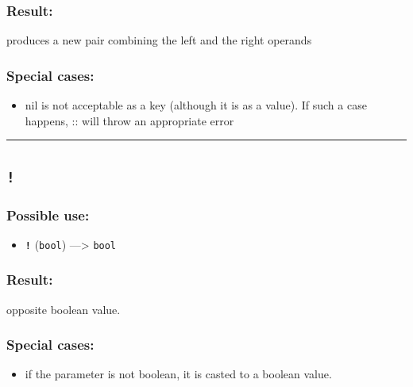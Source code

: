 \documentclass[]{book}
\providecommand{\tightlist}{%
  \setlength{\itemsep}{0pt}\setlength{\parskip}{0pt}}
\theoremstyle{definition}
\theoremstyle{definition}
\theoremstyle{definition}
\theoremstyle{remark}
\begin{document}
\subsubsection{Result:}\label{result-1}

produces a new pair combining the left and the right operands

\subsubsection{Special cases:}\label{special-cases-1}

\begin{itemize}
\tightlist
\item
  nil is not acceptable as a key (although it is as a value). If such a
  case happens, :: will throw an appropriate error
\end{itemize}

\begin{center}\rule{0.5\linewidth}{\linethickness}\end{center}

\subsection{\texorpdfstring{\texttt{!}}{!}}\label{section-3}

\subsubsection{Possible use:}\label{possible-use-3}

\begin{itemize}
\tightlist
\item
  \textbf{\texttt{!}} (\texttt{bool}) ---\textgreater{} \texttt{bool}
\end{itemize}

\subsubsection{Result:}\label{result-2}

opposite boolean value.

\subsubsection{Special cases:}\label{special-cases-2}

\begin{itemize}
\tightlist
\item
  if the parameter is not boolean, it is casted to a boolean value.
\end{itemize}
\end{document}
